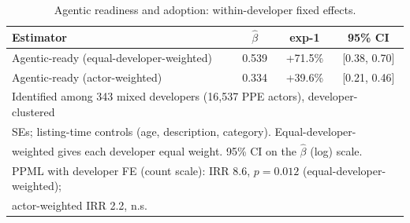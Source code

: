 \begin{table}[t]
  \centering
  \caption{Agentic readiness and adoption: within-developer fixed effects.}
  \label{tab:eligibility_fe}
  \small
  \begin{tabular}{lccc}
    \toprule
    Estimator & $\hat\beta$ & exp-1 & 95\% CI \\
    \midrule
    Agentic-ready (equal-developer-weighted) & 0.539 & +71.5\% & [0.38, 0.70] \\
    Agentic-ready (actor-weighted) & 0.334 & +39.6\% & [0.21, 0.46] \\
    \bottomrule
    \multicolumn{4}{l}{\footnotesize Identified among 343 mixed developers (16{,}537 PPE actors), developer-clustered} \\
    \multicolumn{4}{l}{\footnotesize SEs; listing-time controls (age, description, category). Equal-developer-} \\
    \multicolumn{4}{l}{\footnotesize weighted gives each developer equal weight. 95\% CI on the $\hat\beta$ (log) scale.} \\
    \multicolumn{4}{l}{\footnotesize PPML with developer FE (count scale): IRR 8.6, $p=0.012$ (equal-developer-weighted);} \\
    \multicolumn{4}{l}{\footnotesize actor-weighted IRR 2.2, n.s.}
  \end{tabular}
\end{table}